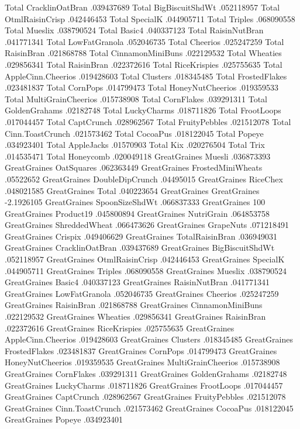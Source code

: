 Total	CracklinOatBran	.039437689
Total	BigBiscuitShdWt	.052118957
Total	OtmlRaisinCrisp	.042446453
Total	SpecialK	.044905711
Total	Triples	.068090558
Total	Mueslix	.038790524
Total	Basic4	.040337123
Total	RaisinNutBran	.041771341
Total	LowFatGranola	.052046735
Total	Cheerios	.025247259
Total	RaisinBran	.021868788
Total	CinnamonMiniBuns	.022129532
Total	Wheaties	.029856341
Total	RaisinBran	.022372616
Total	RiceKrispies	.025755635
Total	AppleCinn.Cheerios	.019428603
Total	Clusters	.018345485
Total	FrostedFlakes	.023481837
Total	CornPops	.014799473
Total	HoneyNutCheerios	.019359533
Total	MultiGrainCheerios	.015738908
Total	CornFlakes	.039291311
Total	GoldenGrahams	.02182748
Total	LuckyCharms	.018711826
Total	FrootLoops	.017044457
Total	CaptCrunch	.028962567
Total	FruityPebbles	.021512078
Total	Cinn.ToastCrunch	.021573462
Total	CocoaPus	.018122045
Total	Popeye	.034923401
Total	AppleJacks	.01570903
Total	Kix	.020276504
Total	Trix	.014535471
Total	Honeycomb	.020049118
GreatGraines	Muesli	.036873393
GreatGraines	OatSquares	.062363449
GreatGraines	FrostedMiniWheats	.05522652
GreatGraines	DoubleDipCrunch	.04495015
GreatGraines	RiceChex	.048021585
GreatGraines	Total	.040223654
GreatGraines	GreatGraines	-2.1926105
GreatGraines	SpoonSizeShdWt	.066837333
GreatGraines	100%
GreatGraines	Product19	.045800894
GreatGraines	NutriGrain	.064853758
GreatGraines	ShreddedWheat	.066473626
GreatGraines	GrapeNuts	.071218491
GreatGraines	Crispix	.049406629
GreatGraines	TotalRaisinBran	.036949031
GreatGraines	CracklinOatBran	.039437689
GreatGraines	BigBiscuitShdWt	.052118957
GreatGraines	OtmlRaisinCrisp	.042446453
GreatGraines	SpecialK	.044905711
GreatGraines	Triples	.068090558
GreatGraines	Mueslix	.038790524
GreatGraines	Basic4	.040337123
GreatGraines	RaisinNutBran	.041771341
GreatGraines	LowFatGranola	.052046735
GreatGraines	Cheerios	.025247259
GreatGraines	RaisinBran	.021868788
GreatGraines	CinnamonMiniBuns	.022129532
GreatGraines	Wheaties	.029856341
GreatGraines	RaisinBran	.022372616
GreatGraines	RiceKrispies	.025755635
GreatGraines	AppleCinn.Cheerios	.019428603
GreatGraines	Clusters	.018345485
GreatGraines	FrostedFlakes	.023481837
GreatGraines	CornPops	.014799473
GreatGraines	HoneyNutCheerios	.019359535
GreatGraines	MultiGrainCheerios	.015738908
GreatGraines	CornFlakes	.039291311
GreatGraines	GoldenGrahams	.02182748
GreatGraines	LuckyCharms	.018711826
GreatGraines	FrootLoops	.017044457
GreatGraines	CaptCrunch	.028962567
GreatGraines	FruityPebbles	.021512078
GreatGraines	Cinn.ToastCrunch	.021573462
GreatGraines	CocoaPus	.018122045
GreatGraines	Popeye	.034923401
